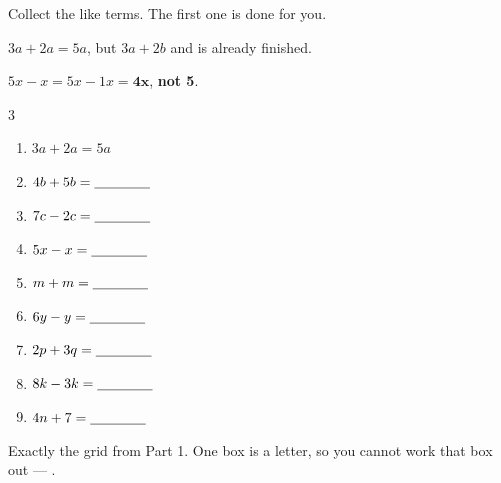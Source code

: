 \documentclass[12pt,a4paper]{article}
\begin{document}


\noindent Collect the like terms. The first one is done for you.

\begin{remember}
   \; $3a + 2a = 5a$, \; but $3a + 2b$
   and is already finished.

  \smallskip
   \; $5x - x = 5x - 1x = \mathbf{4x}$,
  \; {\color{cbred}\bfseries not 5}.
\end{remember}

\vspace{2pt}
\begin{multicols}{3}
\begin{enumerate}[label=(\alph*), itemsep=11pt]
  \item $3a + 2a = 5a$
  \item $4b + 5b = \blank[1.4cm]$
  \item $7c - 2c = \blank[1.4cm]$
  \item $5x - x = \blank[1.4cm]$
  \item $m + m = \blank[1.4cm]$
  \item $6y - y = \blank[1.4cm]$
  \item $2p + 3q = \blank[1.4cm]$
  \item $8k - 3k = \blank[1.4cm]$
  \item $4n + 7 = \blank[1.4cm]$
\end{enumerate}
\end{multicols}


\noindent Exactly the grid from Part 1. One box is a letter, so you cannot work that
box out --- .
\end{document}

